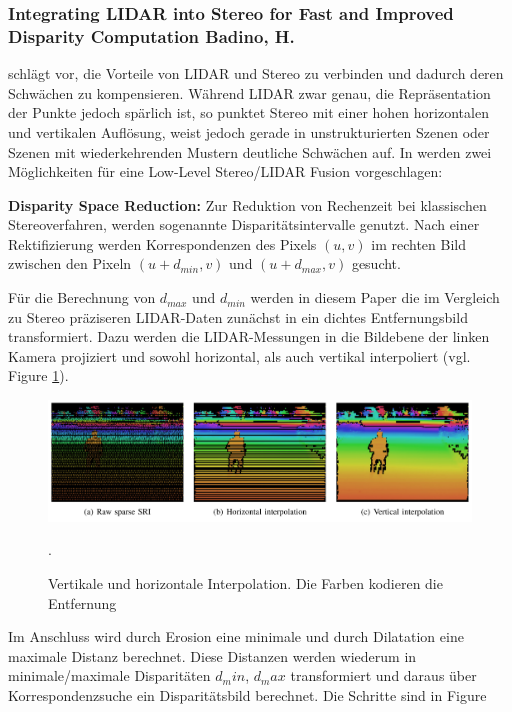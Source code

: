 \documentclass[10pt]{article}
\begin{document}
\subsubsection*{Integrating LIDAR into Stereo for Fast and Improved Disparity Computation Badino, H. \cite{Badino2011a}}

\cite{Badino2011a} schlägt vor, die Vorteile von LIDAR und Stereo zu verbinden und dadurch deren Schwächen zu kompensieren. Während LIDAR zwar genau, die Repräsentation der Punkte jedoch spärlich ist, so punktet Stereo mit einer hohen horizontalen und vertikalen Auflösung, weist jedoch gerade in unstrukturierten Szenen oder Szenen mit wiederkehrenden Mustern deutliche Schwächen auf.
In \cite{Badino2011a} werden zwei Möglichkeiten für eine Low-Level Stereo/LIDAR Fusion vorgeschlagen:

\textbf{Disparity Space Reduction:} Zur Reduktion von Rechenzeit bei klassischen Stereoverfahren, werden sogenannte Disparitätsintervalle genutzt. Nach einer Rektifizierung werden Korrespondenzen des Pixels $(u,v)$ im rechten Bild zwischen den Pixeln $(u+d_{min},v)$ und $(u+d_{max},v)$ gesucht. 

Für die Berechnung von $d_{max}$ und $d_{min}$ werden in diesem Paper die im Vergleich zu Stereo präziseren LIDAR-Daten zunächst in ein dichtes Entfernungsbild transformiert. Dazu werden die LIDAR-Messungen in die Bildebene der linken Kamera projiziert und sowohl horizontal, als auch vertikal interpoliert (vgl. Figure \ref{img:badino_interpolation}).

\begin{figure}[ht]\centering%
	\includegraphics[width=15cm]{images/png/badino_interpolation.png}
	\caption[Badino Interpolation]{ Vertikale und horizontale Interpolation. Die Farben kodieren die Entfernung \cite{Badino2011a} }.
 	\label{img:badino_interpolation}
\end{figure}

Im Anschluss wird durch Erosion eine minimale und durch Dilatation eine maximale Distanz berechnet. Diese Distanzen werden wiederum in minimale/maximale Disparitäten $d_min$, $d_max$ transformiert und daraus über Korrespondenzsuche ein Disparitätsbild berechnet. Die Schritte sind in Figure 
\end{document}
